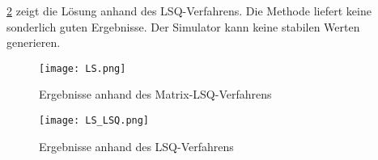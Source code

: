  
\cref{fig:Ergebnisse_zlsq} zeigt die Lösung anhand des LSQ-Verfahrens. Die Methode liefert keine sonderlich guten Ergebnisse. Der Simulator kann keine stabilen Werten generieren. 

\begin{figure}[h!]
	\centering
	\texttt{[image: LS.png]}
	\caption{Ergebnisse anhand des Matrix-LSQ-Verfahrens}
    \label{fig:Ergebnisse_zmlsq}
\end{figure}

 \begin{figure}[h!]
	\centering
	\texttt{[image: LS\_LSQ.png]}
	\caption{Ergebnisse anhand des LSQ-Verfahrens}
     \label{fig:Ergebnisse_zlsq} 
\end{figure}


